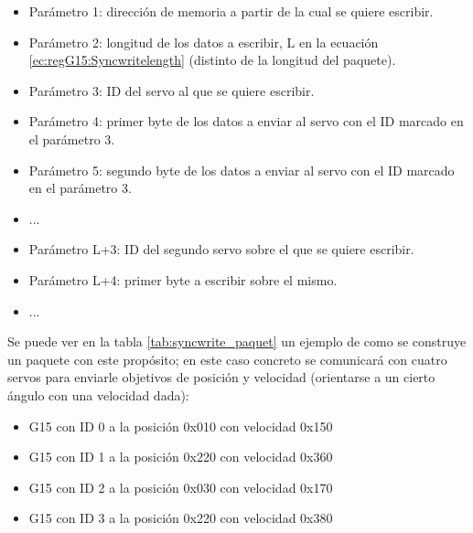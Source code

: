 		\begin{itemize}
			\item Parámetro 1: dirección de memoria a partir de la cual se quiere escribir.
			\item Parámetro 2: longitud de los datos a escribir, L en la ecuación \ref{ec:regG15:Syncwritelength} (distinto de la longitud del paquete).
			\item Parámetro 3: ID del servo al que se quiere escribir.
			\item Parámetro 4: primer byte de los datos a enviar al servo con el ID marcado en el parámetro 3.
			\item Parámetro 5: segundo byte de los datos a enviar al servo con el ID marcado en el parámetro 3.
			\item ...
			\item Parámetro L+3: ID del segundo servo sobre el que se quiere escribir.
			\item Parámetro L+4: primer byte a escribir sobre el mismo.
			\item ...
		\end{itemize}

		Se puede ver en la tabla \ref{tab:syncwrite_paquet} un ejemplo de como se construye un paquete con este propósito; en este caso concreto se comunicará con cuatro servos para enviarle objetivos de posición y velocidad (orientarse a un cierto ángulo con una velocidad dada):
		\\

		\begin{itemize}
			\item G15 con ID 0 a la posición 0x010 con velocidad 0x150
			\item G15 con ID 1 a la posición 0x220 con velocidad 0x360
			\item G15 con ID 2 a la posición 0x030 con velocidad 0x170
			\item G15 con ID 3 a la posición 0x220 con velocidad 0x380
		\end{itemize}

